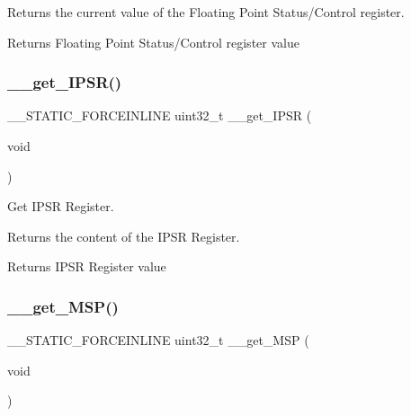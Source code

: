 Returns the current value of the Floating Point Status/\+Control register. \begin{DoxyReturn}{Returns}
Floating Point Status/\+Control register value 
\end{DoxyReturn}
\mbox{\label{group___c_m_s_i_s___core___reg_acc_functions_gaf15a71855b9d731d11de92704c82bd18}} 
\subsubsection{\texorpdfstring{\_\_get\_IPSR()}{\_\_get\_IPSR()}}
{\footnotesize\ttfamily \+\_\+\+\_\+\+S\+T\+A\+T\+I\+C\+\_\+\+F\+O\+R\+C\+E\+I\+N\+L\+I\+NE uint32\+\_\+t \+\_\+\+\_\+get\+\_\+\+I\+P\+SR (\begin{DoxyParamCaption}\item[{void}]{ }\end{DoxyParamCaption})}



Get I\+P\+SR Register. 

Returns the content of the I\+P\+SR Register. \begin{DoxyReturn}{Returns}
I\+P\+SR Register value 
\end{DoxyReturn}
\mbox{\label{group___c_m_s_i_s___core___reg_acc_functions_ga667e7b8b97b4a30f445ae45d37588e45}} 
\subsubsection{\texorpdfstring{\_\_get\_MSP()}{\_\_get\_MSP()}}
{\footnotesize\ttfamily \+\_\+\+\_\+\+S\+T\+A\+T\+I\+C\+\_\+\+F\+O\+R\+C\+E\+I\+N\+L\+I\+NE uint32\+\_\+t \+\_\+\+\_\+get\+\_\+\+M\+SP (\begin{DoxyParamCaption}\item[{void}]{ }\end{DoxyParamCaption})}



